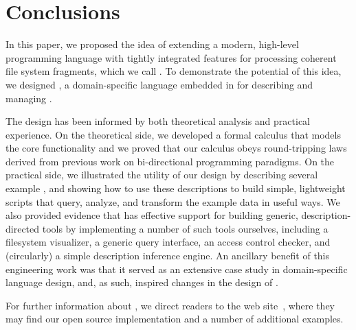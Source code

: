 \section{Conclusions}
\label{sec:conclusion}


In this paper, we proposed the idea of extending a modern, high-level
programming language with tightly integrated features for
processing coherent file system fragments, which we call
\filestores{}.  To demonstrate the
potential of this idea, we designed \forest{}, a
domain-specific language 
embedded in \haskell{}
for describing and managing \filestores{}.  

The \forest{} design has been informed by both
theoretical analysis and practical experience.
On the theoretical side, 
we developed a formal
calculus that models the core \forest{} functionality and
we proved that our calculus obeys round-tripping laws
derived from previous work on bi-directional programming paradigms.
On the practical side, 
we illustrated the utility of our design
by describing several example \filestores{}, and showing how
to use these descriptions
to build simple, lightweight \haskell{} scripts that query,  
analyze, and transform the example data in useful ways.
We also provided evidence that
\forest{} has effective support for building
generic, description-directed tools by 
implementing a number of such 
tools ourselves, including a filesystem visualizer,
a generic query interface, an access control checker, and
(circularly) a simple description inference engine.
An ancillary benefit of this 
engineering work was that it
served as an extensive case study in domain-specific
language design, and, as such, inspired changes in the design of
\template{}.  

For further information about \forest{}, we direct readers to
the \forest{} web site~\cite{forest-web-site}, where they may find
our open source implementation and a number of
additional examples.

